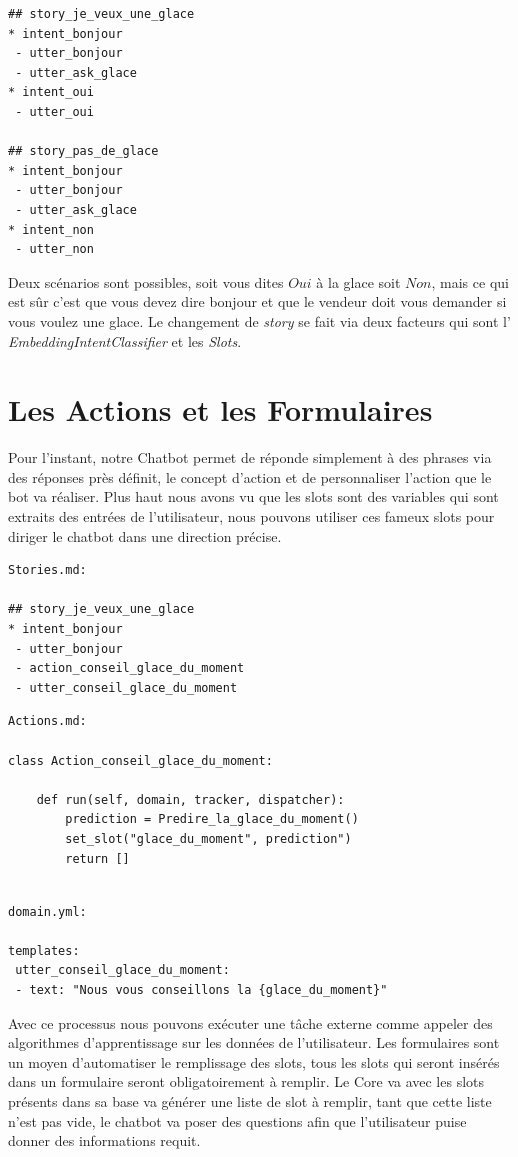 \begin{lstlisting}
## story_je_veux_une_glace
* intent_bonjour
 - utter_bonjour
 - utter_ask_glace
* intent_oui
 - utter_oui
 
## story_pas_de_glace
* intent_bonjour
 - utter_bonjour
 - utter_ask_glace
* intent_non
 - utter_non
\end{lstlisting}

Deux scénarios sont possibles, soit vous dites $Oui$ à la glace soit $Non$, mais ce qui est sûr c'est que vous devez dire bonjour et que le vendeur doit vous demander si vous voulez une glace.
Le changement de \textit{story} se fait via deux facteurs qui sont l' \textit{EmbeddingIntentClassifier} et les \textit{Slots}.

\section{Les Actions et les Formulaires}
Pour l'instant, notre Chatbot permet de réponde simplement à des phrases via des réponses près définit, le concept d'action et de personnaliser l'action que le bot va réaliser. Plus haut nous avons vu que les slots sont des variables qui sont extraits des entrées de l'utilisateur, nous pouvons utiliser ces fameux slots pour diriger le chatbot dans une direction précise.

\begin{lstlisting}
Stories.md:

## story_je_veux_une_glace
* intent_bonjour
 - utter_bonjour
 - action_conseil_glace_du_moment
 - utter_conseil_glace_du_moment
\end{lstlisting}

\begin{lstlisting}
Actions.md:

class Action_conseil_glace_du_moment:

	def run(self, domain, tracker, dispatcher):
		prediction = Predire_la_glace_du_moment()
		set_slot("glace_du_moment", prediction")
		return []
		
\end{lstlisting}

\begin{lstlisting}
domain.yml:

templates:
 utter_conseil_glace_du_moment:
 - text: "Nous vous conseillons la {glace_du_moment}"
\end{lstlisting}

Avec ce processus nous pouvons exécuter une tâche externe comme appeler des algorithmes d'apprentissage sur les données de l'utilisateur.\linebreak
Les formulaires sont un moyen d'automatiser le remplissage des slots, tous les slots qui seront insérés dans un formulaire seront obligatoirement à remplir. Le Core va avec les slots présents dans sa base va générer une liste de slot à remplir, tant que cette liste n'est pas vide, le chatbot va poser des questions afin que l'utilisateur puise donner des informations requit.
